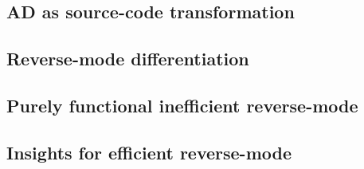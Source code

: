 

\subsection{AD as source-code transformation}

\subsection{Reverse-mode differentiation}

\subsection{Purely functional inefficient reverse-mode}

\subsection{Insights for efficient reverse-mode}